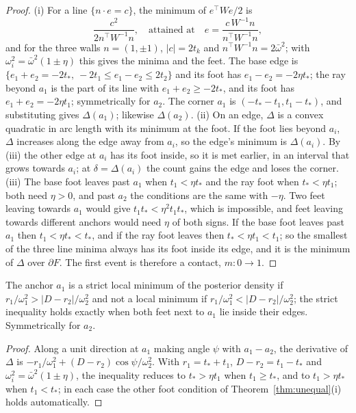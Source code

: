 \begin{proof}
(i) For a line $\{n\cdot e = c\}$, the minimum of $e^\top We/2$ is
\[ \frac{c^2}{2n^\top W^{-1}n}, \quad\text{attained at}\quad e = \frac{c\,W^{-1}n}{n^\top W^{-1}n}, \]
and for the three walls $n = (1, \pm1)$, $|c| = 2t_k$ and $n^\top W^{-1}n = 2\bar\omega^2$; with $\omega_i^2 = \bar\omega^2(1 \pm \eta)$ this
gives the minima and the feet. The base edge is $\{e_1 + e_2 = -2t_*,\ -2t_1 \le e_1 - e_2 \le 2t_2\}$
and its foot has $e_1 - e_2 = -2\eta t_*$; the ray beyond $a_1$ is the part of its line with $e_1 + e_2 \ge -2t_*$, and its
foot has $e_1 + e_2 = -2\eta t_1$; symmetrically for $a_2$. The corner $a_1$ is $(-t_* - t_1, t_1 - t_*)$, and substituting
gives $\Delta(a_1)$; likewise $\Delta(a_2)$. (ii) On an edge, $\Delta$ is a convex quadratic in arc length with its minimum at
the foot. If the foot lies beyond $a_i$, $\Delta$ increases along the edge away from $a_i$, so the edge's minimum is
$\Delta(a_i)$. By (iii) the other edge at $a_i$ has its foot inside, so it is met earlier, in an interval that grows towards
$a_i$; at $\delta = \Delta(a_i)$ the count gains the edge and loses the corner. (iii) The base foot leaves past $a_1$ when
$t_1 < \eta t_*$ and the ray foot when $t_* < \eta t_1$; both need $\eta > 0$, and past $a_2$ the conditions are the same
with $-\eta$. Two feet leaving towards $a_1$ would give $t_1t_* < \eta^2 t_1t_*$, which is impossible, and feet leaving
towards different anchors would need $\eta$ of both signs. If the base foot leaves past $a_1$ then $t_1 < \eta t_* < t_*$,
and if the ray foot leaves then $t_* < \eta t_1 < t_1$; so the smallest of the three line minima always has its foot
inside its edge, and it is the minimum of $\Delta$ over $\partial F$. The first event is therefore a contact, $m: 0 \to 1$.
\end{proof}

\begin{corollary}\label{cor:anchortest}
The anchor $a_1$ is a strict local minimum of the posterior density if $r_1/\omega_1^2 > |D - r_2|/\omega_2^2$ and not a local
minimum if $r_1/\omega_1^2 < |D - r_2|/\omega_2^2$; the strict inequality holds exactly when both feet next to $a_1$ lie inside
their edges. Symmetrically for $a_2$.
\end{corollary}

\begin{proof}
Along a unit direction at $a_1$ making angle $\psi$ with $a_1 - a_2$, the derivative of $\Delta$ is
$-r_1/\omega_1^2 + (D - r_2)\cos\psi/\omega_2^2$. With $r_1 = t_* + t_1$, $D - r_2 = t_1 - t_*$ and $\omega_i^2 = \bar\omega^2(1 \pm \eta)$, the
inequality reduces to $t_* > \eta t_1$ when $t_1 \ge t_*$, and to $t_1 > \eta t_*$ when $t_1 < t_*$; in each case the other
foot condition of Theorem~\ref{thm:unequal}(i) holds automatically.
\end{proof}

